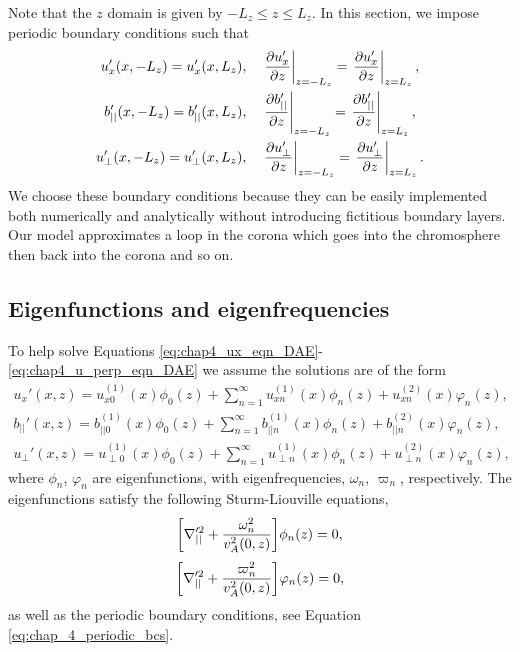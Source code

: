 Note that the $z$ domain is given by $-L_z\le z\le L_z$. In this section, we impose periodic boundary conditions such that 
\begin{gather}
    \label{eq:chap_4_periodic_bcs}
    u_x'(x,-L_z)=u_x'(x,L_z),\quad \left.\pdv{u_x'}{z}\right|_{z=-L_z}=\left.\pdv{u_x'}{z}\right|_{z=L_z}, \\
    b_{||}'(x,-L_z)=b_{||}'(x,L_z),\quad \left.\pdv{b_{||}'}{z}\right|_{z=-L_z}=\left.\pdv{b_{||}'}{z}\right|_{z=L_z}, \\
    u_\perp'(x,-L_z)=u_\perp'(x,L_z),\quad \left.\pdv{u_\perp'}{z}\right|_{z=-L_z}=\left.\pdv{u_\perp'}{z}\right|_{z=L_z}.
\end{gather}
We choose these boundary conditions because they can be easily implemented both numerically and analytically without introducing fictitious boundary layers. Our model approximates a loop in the corona which goes into the chromosphere then back into the corona and so on.

\subsection{Eigenfunctions and eigenfrequencies}

To help solve Equations \eqref{eq:chap4_ux_eqn_DAE}-\eqref{eq:chap4_u_perp_eqn_DAE} we assume the solutions are of the form
\begin{gather}
    \label{eq:chap_4_oblique_ux_eigenfunction_expansion}
    u_x'(x,z) = u_{x0}^{(1)}(x)\phi_0(z) + \sum_{n=1}^\infty u_{xn}^{(1)}(x)\phi_n(z) + u_{xn}^{(2)}(x)\varphi_n(z), \\
    \label{eq:chap_4_oblique_b_par_eigenfunction_expansion}
    b_{||}'(x,z) = b_{||0}^{(1)}(x)\phi_0(z) + \sum_{n=1}^\infty b_{||n}^{(1)}(x)\phi_n(z) + b_{||n}^{(2)}(x)\varphi_n(z), \\
    \label{eq:chap_4_oblique_u_perp_eigenfunction_expansion}
    u_\perp'(x,z) = u_{\perp0}^{(1)}(x)\phi_0(z) + \sum_{n=1}^\infty u_{\perp n}^{(1)}(x)\phi_n(z) + u_{\perp n}^{(2)}(x)\varphi_n(z),
\end{gather}
where $\phi_n$, $\varphi_n$ are eigenfunctions, with eigenfrequencies, $\omega_n$, $\varpi_n$, respectively. The eigenfunctions satisfy the following Sturm-Liouville equations,
\[\qty[\nabla_{||}'^2+\frac{\omega_n^2}{v_A^2(0,z)}]\phi_n(z)=0,\]
\[\qty[\nabla_{||}'^2+\frac{{\varpi}_n^2}{v_A^2(0,z)}]\varphi_n(z)=0,\]
as well as the periodic boundary conditions, see Equation \eqref{eq:chap_4_periodic_bcs}.

